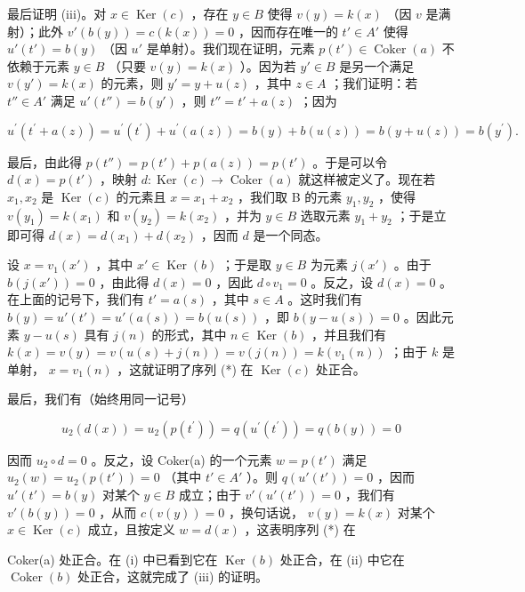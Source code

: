 最后证明 (iii)。对 \(x \in \operatorname{Ker}(c)\) ，存在 \(y \in B\) 使得 \(v(y) = k(x)\) （因 \(v\) 是满射）；此外 \(v'(b(y)) = c(k(x)) = 0\) ，因而存在唯一的 \(t' \in A'\) 使得 \(u'(t') = b(y)\) （因 \(u'\) 是单射）。我们现在证明，元素 \(p(t') \in \operatorname{Coker}(a)\) 不依赖于元素 \(y \in B\) （只要 \(v(y) = k(x)\) ）。因为若 \(y' \in B\) 是另一个满足 \(v(y') = k(x)\) 的元素，则 \(y' = y + u(z)\) ，其中 \(z \in A\) ；我们证明：若 \(t'' \in A'\) 满足 \(u'(t'') = b(y')\) ，则 \(t'' = t' + a(z)\) ；因为

\[
u ^ {\prime} \left(t ^ {\prime} + a (z)\right) = u ^ {\prime} \left(t ^ {\prime}\right) + u ^ {\prime} (a (z)) = b (y) + b (u (z)) = b (y + u (z)) = b \left(y ^ {\prime}\right).
\]

最后，由此得 \(p(t'') = p(t') + p(a(z)) = p(t')\) 。于是可以令 \(d(x) = p(t')\) ，映射 \(d: \operatorname{Ker}(c) \to \operatorname{Coker}(a)\) 就这样被定义了。现在若 \(x_1, x_2\) 是 \(\operatorname{Ker}(c)\) 的元素且 \(x = x_1 + x_2\) ，我们取 B 的元素 \(y_1, y_2\) ，使得 \(v(y_1) = k(x_1)\) 和 \(v(y_2) = k(x_2)\) ，并为 \(y \in B\) 选取元素 \(y_1 + y_2\) ；于是立即可得 \(d(x) = d(x_1) + d(x_2)\) ，因而 \(d\) 是一个同态。

设 \(x = v_{1}(x')\) ，其中 \(x' \in \operatorname{Ker}(b)\) ；于是取 \(y \in B\) 为元素 \(j(x')\) 。由于 \(b(j(x')) = 0\) ，由此得 \(d(x) = 0\) ，因此 \(d \circ v_{1} = 0\) 。反之，设 \(d(x) = 0\) 。在上面的记号下，我们有 \(t' = a(s)\) ，其中 \(s \in A\) 。这时我们有 \(b(y) = u'(t') = u'(a(s)) = b(u(s))\) ，即 \(b(y - u(s)) = 0\) 。因此元素 \(y - u(s)\) 具有 \(j(n)\) 的形式，其中 \(n \in \operatorname{Ker}(b)\) ，并且我们有 \(k(x) = v(y) = v(u(s) + j(n)) = v(j(n)) = k(v_1(n))\) ；由于 \(k\) 是单射， \(x = v_1(n)\) ，这就证明了序列 (*) 在 \(\operatorname{Ker}(c)\) 处正合。

最后，我们有（始终用同一记号）

\[
u _ {2} (d (x)) = u _ {2} \left(p \left(t ^ {\prime}\right)\right) = q \left(u ^ {\prime} \left(t ^ {\prime}\right)\right) = q (b (y)) = 0
\]

因而 \(u_2 \circ d = 0\) 。反之，设 Coker(a) 的一个元素 \(w = p(t')\) 满足 \(u_2(w) = u_2(p(t')) = 0\) （其中 \(t' \in A'\) ）。则 \(q(u'(t')) = 0\) ，因而 \(u'(t') = b(y)\) 对某个 \(y \in B\) 成立；由于 \(v'(u'(t')) = 0\) ，我们有 \(v'(b(y)) = 0\) ，从而 \(c(v(y)) = 0\) ，换句话说， \(v(y) = k(x)\) 对某个 \(x \in \operatorname{Ker}(c)\) 成立，且按定义 \(w = d(x)\) ，这表明序列 (*) 在

Coker(a) 处正合。在 (i) 中已看到它在 \(\operatorname{Ker}(b)\) 处正合，在 (ii) 中它在 \(\operatorname{Coker}(b)\) 处正合，这就完成了 (iii) 的证明。

